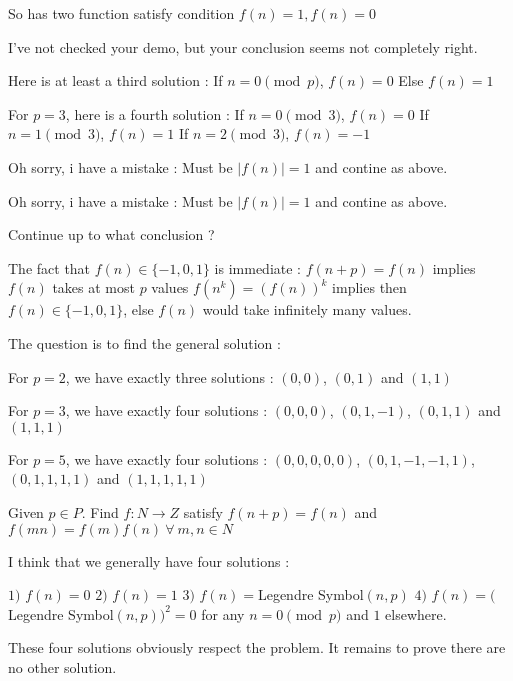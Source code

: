 \begin{mysolution}
	\begin{tcolorbox}So has two function satisfy condition 
$ f(n) = 1,f(n) = 0$\end{tcolorbox}

I've not checked your demo, but your conclusion seems not completely right.

Here is at least a third solution :
If $ n=0\pmod{p}$, $ f(n)=0$
Else $ f(n)=1$

For $ p=3$, here is a fourth solution :
If $ n=0\pmod{3}$, $ f(n)=0$
If $ n=1\pmod{3}$, $ f(n)=1$
If $ n=2\pmod{3}$, $ f(n)=-1$
\end{mysolution}



\begin{mysolution}
	Oh sorry, i have a mistake : 
Must be $ |f(n)|=1$ and contine as above.
\end{mysolution}



\begin{mysolution}
	\begin{tcolorbox}Oh sorry, i have a mistake : 
Must be $ |f(n)| = 1$ and contine as above.\end{tcolorbox}

Continue up to what conclusion ?

The fact that $ f(n)\in\{-1,0,1\}$ is immediate :
$ f(n+p)=f(n)$ implies $ f(n)$ takes at most $ p$ values
$ f(n^k)=(f(n))^k$ implies then $ f(n)\in\{-1,0,1\}$, else $ f(n)$ would take infinitely many values.

The question is to find the general solution :

For $ p=2$, we have exactly three solutions : $ (0,0)$, $ (0,1)$ and $ (1,1)$

For $ p=3$, we have exactly four solutions : $ (0,0,0)$, $ (0,1,-1)$, $ (0,1,1)$ and $ (1,1,1)$

For $ p=5$, we have exactly four solutions : $ (0,0,0,0,0)$, $ (0,1,-1,-1,1)$, $ (0,1,1,1,1)$ and $ (1,1,1,1,1)$
\end{mysolution}



\begin{mysolution}
	\begin{tcolorbox}Given $ p \in P$. Find $ f: N \to Z$ satisfy $ f(n + p) = f(n)$ and $ f(mn) = f(m)f(n) \ \forall \ m,n \in N$\end{tcolorbox}

I think that we generally have four solutions :

$ 1)$ $ f(n)=0$
$ 2)$ $ f(n)=1$
$ 3)$ $ f(n)=$Legendre Symbol$ (n,p)$
$ 4)$ $ f(n)=($Legendre Symbol$ (n,p))^2=0$ for any $ n=0\pmod{p}$ and $ 1$ elsewhere.

These four solutions obviously respect the problem. It remains to prove there are no other solution.
\end{mysolution}



